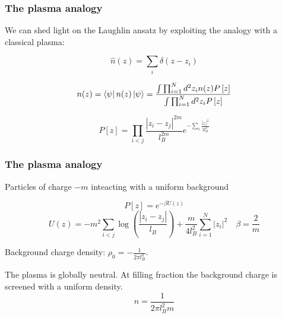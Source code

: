 \documentclass{beamer}
\begin{document}
\begin{frame}
\frametitle{The plasma analogy}
\begin{center}

We can shed light on the Laughlin ansatz by exploiting the analogy with a classical plasma:

\[
\hat{n}(z) = \sum_i \delta (z - z_i)
\]

\[
n(z) = \bra{\psi} n(z) \ket{\psi} = \frac{\int \prod_{i=1}^{N} d^2 z_i n(z) P \left[ z \right] }{ \int \prod_{i=1}^{N} d^2 z_i P \left[ z \right]}
\]

\[
P \left[ z \right] = \prod_{i < j} \frac{|z_i - z_j|^{2m}}{l_B^{2m}} e^{-\sum_{i} \frac{| z_i |^2}{2 l_B^2}}
\]

\end{center}
\end{frame}

\begin{frame}
\frametitle{The plasma analogy}
\begin{center}

Particles of charge $-m$ inteacting with a uniform background

\[
P \left[ z \right] = e^{- \beta U(z)}
\]
\[
U(z) = - m^2 \sum_{i < j} \log \left( \frac{| z_i - z_j|}{l_B} \right) + \frac{m}{4 l_B^2} \sum_{i = 1}^{N} |z_i|^2 \quad \beta = \frac{2}{m}
\]



Background charge density: $\rho_0 = -\frac{1}{2 \pi l_B^2}$. 

The plasma is globally neutral. At filling fraction the background charge is screened with a uniform density.
\[
n = \frac{1}{2 \pi l_B^2 m}
\]


\end{center}
\end{frame}
\end{document}
